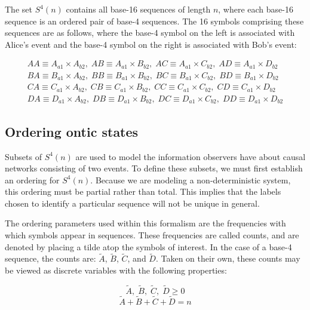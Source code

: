 \documentclass{article}
\begin{document}
The set $S^4(n)$ contains all base-16 sequences of length $n$, where each base-16 sequence is an ordered pair of base-4 sequences. The 16 symbols comprising these sequences are as follows, where the base-4 symbol on the left is associated with Alice's event and the base-4 symbol on the right is associated with Bob's event:

\begin{equation}
\begin{array}{cc}
AA \equiv A_{a1}\times A_{b2},\;AB\equiv A_{a1}\times B_{b2},\;AC\equiv A_{a1}\times C_{b2},\;AD\equiv A_{a1}\times D_{b2}\\
BA \equiv B_{a1}\times A_{b2},\;BB\equiv B_{a1}\times B_{b2},\;BC\equiv B_{a1}\times C_{b2},\;BD\equiv B_{a1}\times D_{b2}\\
CA \equiv C_{a1}\times A_{b2},\;CB\equiv C_{a1}\times B_{b2},\;CC\equiv C_{a1}\times C_{b2},\;CD\equiv C_{a1}\times D_{b2}\\
DA \equiv D_{a1}\times A_{b2},\;DB\equiv D_{a1}\times B_{b2},\;DC\equiv D_{a1}\times C_{b2},\;DD\equiv D_{a1}\times D_{b2}
\end{array}
\label{eq: base-16 symbols}
\end{equation}


\subsection{Ordering ontic states \label{sec: ordering ontic states}}

Subsets of $S^4(n)$ are used to model the information observers have about causal networks consisting of two events. To define these subsets, we must first establish an ordering for $S^4(n)$. Because we are modeling a non-deterministic system, this ordering must be partial rather than total. This implies that the labels chosen to identify a particular sequence will not be unique in general. 

The ordering parameters used within this formalism are the frequencies with which symbols appear in sequences. These frequencies are called counts, and are denoted by placing a tilde atop the symbols of interest. In the case of a base-4 sequence, the counts are: $\tilde{A}$, $\tilde{B}$, $\tilde{C}$, and $\tilde{D}$. Taken on their own, these counts may be viewed as discrete variables with the following properties:

\begin{equation}
    \tilde{A},\;\tilde{B},\;\tilde{C},\;\tilde{D}\geq0
    \label{eq: base-4 discrete variables geq}
\end{equation}
\begin{equation}
    \tilde{A}+\tilde{B}+\tilde{C}+\tilde{D}=n
    \label{eq: base-4 discrete variables eqn}
\end{equation}
\end{document}
